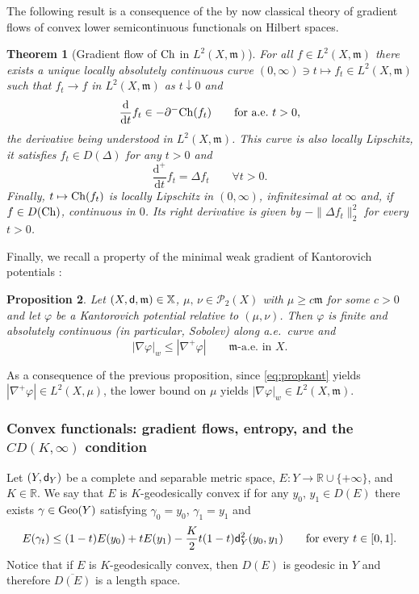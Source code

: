 \documentclass[reqno,11pt]{article}
\numberwithin{equation}{section}
\newcommand{\C}{\mathbb{C}}
\newcommand{\R}{\mathbb{R}}
\newcommand{\mm}{{\mbox{\boldmath$m$}}}
\newcommand{\sfd}{{\sf d}}
\renewcommand{\d}{{\mathrm d}}
\newcommand{\dt}{{\d t}}
\newcommand{\ProbabilitiesTwo}[1]{\mathscr P_2(#1)}     %
\newtheorem{theorem}{Theorem}[section]
\newtheorem{proposition}[theorem]{Proposition}
\newcommand{\probt}{\ProbabilitiesTwo}
\newcommand{\geo}{{\rm{Geo}}}                       %
\newcommand{\X}{\mathbb X}
\newcommand{\weakgrad}[1]{|\nabla #1|_w}                %
\renewcommand{\C}{{\rm Ch}}
\newcommand{\Deltam}{\Delta}
\renewcommand{\mm}{\mathfrak m}
\begin{document}
The following result is a consequence of the by now classical theory
of gradient flows of convex lower semicontinuous functionals on
Hilbert spaces.

\begin{theorem}[Gradient flow of $\C$ in $L^2(X,\mm)$]\label{thm:gfc}
For all $f\in L^2(X,\mm)$ there exists a unique locally absolutely
continuous curve $(0,\infty)\ni t\mapsto f_t\in L^2(X,\mm)$ such
that $f_t\to f$ in $L^2(X,\mm)$ as $t\downarrow 0$ and
\[
\frac{\d}{\dt}f_t\in -\partial^-\C(f_t)\qquad\text{for a.e.~$t>0$,}
\]
the derivative being understood in $L^2(X,\mm)$. This curve is also
locally Lipschitz, it satisfies $f_t\in D(\Deltam)$ for any $t>0$
and
\[
\frac{\d^+}{\dt}f_t=\Deltam f_t\qquad\forall t>0.
\]
Finally, $t\mapsto \C(f_t)$ is locally Lipschitz in $(0,\infty)$,
infinitesimal at $\infty$ and, if $f\in D(\C)$, continuous in $0$.
Its right derivative is given by $-\|\Deltam f_t\|^2_2$ for every
$t>0$.
\end{theorem}

Finally, we recall a property of the minimal weak gradient of
Kantorovich potentials \cite[Lemma~10.1]{Ambrosio-Gigli-Savare11}:
\begin{proposition}\label{prop:potkant}
Let $(X,\sfd,\mm)\in\X$, $\mu,\,\nu\in\probt X$ with $\mu\geq c\mm$
for some $c>0$ and let $\varphi$ be a Kantorovich potential relative
to $(\mu,\nu)$. Then $\varphi$ is finite and absolutely continuous
(in particular, Sobolev) along a.e.~curve and
\[
\weakgrad\varphi\leq|\nabla^+\varphi|\qquad\text{$\mm$-a.e.~in $X$.}
\]
\end{proposition}

As a consequence of the previous proposition, since
\eqref{eq:propkant} yields $|\nabla^+\varphi|\in L^2(X,\mu)$, the
lower bound on $\mu$ yields $\weakgrad\varphi\in L^2(X,\mm)$.

\subsubsection{Convex functionals: gradient flows, entropy, and the
$CD(K,\infty)$ condition}

Let $(Y,\sfd_Y)$ be a complete and separable metric space,
$E:Y\to\R\cup\{+\infty\}$, and $K\in\R$. We say that $E$ is
$K$-geodesically convex if for any $y_0,\,y_1\in D(E)$ there exists
$\gamma\in\geo(Y)$ satisfying $\gamma_0=y_0$, $\gamma_1=y_1$ and
\[
E(\gamma_t)\leq (1-t)E(y_0)+tE(y_1)-\frac K2t(1-t)
\sfd_Y^2(y_0,y_1)\qquad\text{for every } t\in[0,1].
\]
Notice that if $E$ is $K$-geodesically convex, then $D(E)$ is
geodesic in $Y$ and therefore $\overline{D(E)}$ is a length space.
\end{document}
